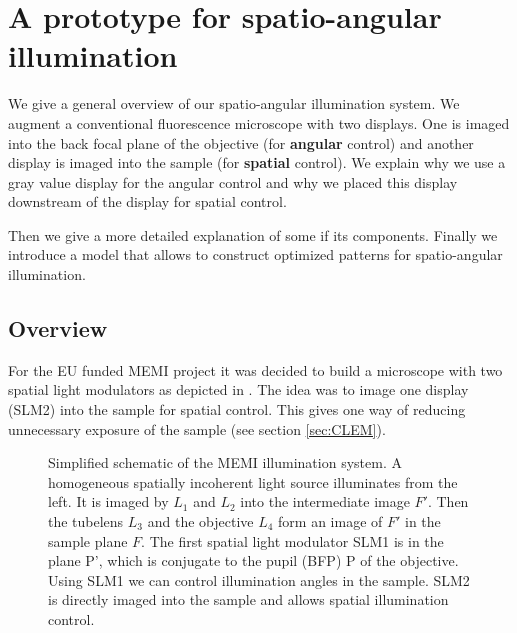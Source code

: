 
\newcommand{\imagw}[3]{
  \begin{figure}[!hbt]
    \centering
    \texttt{[image: \#2]}
    \caption{#3}
    \label{fig:#2}
  \end{figure}
}

\newcommand{\imag}[2]{\imagw{16cm}{#1}{#2}}

\chapter{A prototype for spatio-angular illumination}
\label{sec:setup}
\begin{summary}
  We give a general overview of our spatio-angular illumination
  system. We augment a conventional fluorescence microscope with two
  displays. One is imaged into the back focal plane of the objective
  (for {\bf angular} control) and another display is imaged into the
  sample (for {\bf spatial} control). We explain why we use a gray
  value display for the angular control and why we placed this display
  downstream of the display for spatial control.

  Then we give a more detailed explanation of some if its
  components. Finally we introduce a model that allows to construct
  optimized patterns for spatio-angular illumination.
\end{summary}

\section{Overview}
For the EU funded MEMI project it was decided to build a microscope
with two spatial light modulators as depicted in
. The idea was to image one display (SLM2)
into the sample for spatial control. This gives one way of reducing
unnecessary exposure of the sample (see section \ref{sec:CLEM}).

\begin{figure}[!hbt]
  \centering
  \def\svgscale{1.5}
  
  \caption{Simplified schematic of the MEMI illumination system. A
    homogeneous spatially incoherent light source illuminates from the
    left. It is imaged by $L_1$ and $L_2$ into the intermediate image
    $F'$. Then the tubelens $L_3$ and the objective $L_4$ form an
    image of $F'$ in the sample plane $F$. The first spatial light
    modulator SLM1 is in the plane P', which is conjugate to the pupil
    (BFP) P of the objective. Using SLM1 we can control illumination
    angles in the sample. SLM2 is directly imaged into the sample and
    allows spatial illumination control.} \label{fig:memi-simple}
\end{figure}

